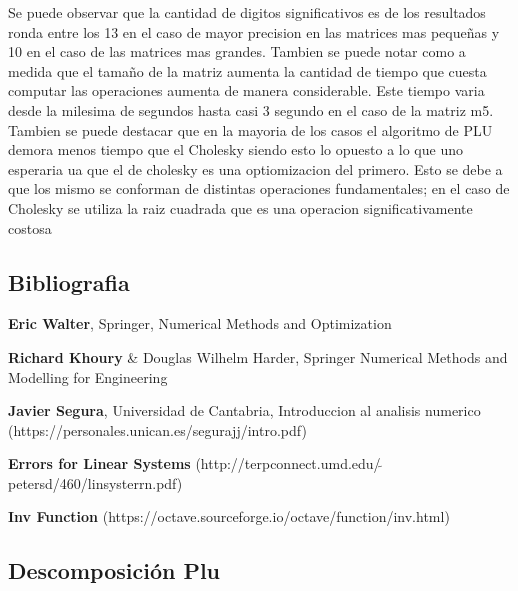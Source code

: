 \documentclass[10pt]{article}
\begin{document}
Se puede observar que la cantidad de digitos significativos es de los resultados
ronda entre los 13 en el caso de mayor precision en las matrices mas pequeñas
y 10 en el caso de las matrices mas grandes. Tambien se puede notar como a medida
que el tamaño de la matriz aumenta la cantidad de tiempo que cuesta computar las
operaciones aumenta de manera considerable. Este tiempo varia desde la milesima de
segundos hasta casi 3 segundo en el caso de la matriz m5. Tambien se puede destacar
que en la mayoria de los casos el algoritmo de PLU demora menos tiempo que el Cholesky
siendo esto lo opuesto a lo que uno esperaria ua que el de cholesky es una optiomizacion
del primero. Esto se debe a que los mismo se conforman de distintas operaciones
fundamentales; en el caso de Cholesky se utiliza la raiz cuadrada que es una operacion
significativamente costosa



{}
\subsection*{Bibliografia}



\textbf{Eric Walter}, Springer, Numerical Methods and Optimization



\textbf{Richard Khoury} \& Douglas Wilhelm Harder, Springer
    Numerical Methods and Modelling for Engineering



\textbf{Javier Segura}, Universidad de Cantabria, Introduccion al analisis numerico
    (https://personales.unican.es/segurajj/intro.pdf)



\textbf{Errors for Linear Systems}
    (http://terpconnect.umd.edu/\ensuremath{\tilde{\;}}petersd/460/linsysterrn.pdf)



\textbf{Inv Function}
    (https://octave.sourceforge.io/octave/function/inv.html)



{}
\subsection*{Descomposición Plu}
\end{document}
